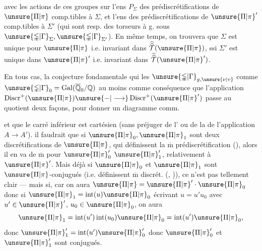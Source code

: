 avec les actions de ces groupes sur l'ens $P_{\Sigma}$ des prédiscrétifications de $\unsure{\Pi|\pi}$ comp.tibles à $\Sigma$, et l'ens  des prédiscrétifications de $\unsure{\Pi|\pi}'$ comp.tibles à $\Sigma'$ (qui sont resp. des torseurs à g. sous $\unsure{\mathbb{\Gamma}|\Gamma}_{\Sigma},\unsure{\mathbb{\Gamma}|\Gamma}_{\Sigma'}$). En même temps, on trouvera  que $\Sigma$ est unique pour $\unsure{\Pi|\pi}$ i.e. invariant dans $\widehat{\widehat{\mathcal T}}(\unsure{\Pi|\pi})$, ssi $\Sigma'$ est unique dans $\unsure{\Pi|\pi}'$ i.e. invariant dans $\widehat{\widehat{\mathcal T}}(\unsure{\Pi|\pi}')$.

En tous cas, la conjecture fondamentale qui  les $\unsure{\mathbb{\Gamma}|\Gamma}_{g,\unsure{\nu|v}}$ comme $\unsure{\mathbb{\Gamma}|\Gamma}_0=\operatorname{Gal}(\overline{\mathbb Q}_0/\mathbb Q)$  au moins comme conséquence que l'application $\operatorname{Discr}^{+}(\unsure{\Pi|\pi})\unsure{-|\longrightarrow}\operatorname{Discr}^{+}(\unsure{\Pi|\pi}')$ passe au quotient  deux façons, pour donner un diagramme comm.


et que le  carré inférieur est cartésien (sans préjuger de l' ou de la  de l'application $A\longrightarrow A'$).  il faudrait
que  si $\unsure{\Pi|\pi}_0,\unsure{\Pi|\pi}_1$ sont deux discrétifications  de $\unsure{\Pi|\pi}$, qui définissent la $\overline{\mathrm m}$ prédiscrétification (), alors il en va de $\overline{\mathrm m}$ pour  $\unsure{\Pi|\pi}'_0$  $\unsure{\Pi|\pi}'_1$, relativement à $\unsure{\Pi|\pi}'$. Mais déjà si $\unsure{\Pi|\pi}_0$ et $\unsure{\Pi|\pi}_1$ sont $\unsure{\Pi|\pi}$-conjugués (i.e. définissent $\overline{\mathrm m}$ discrét. (, \uline{})), ce n'est pas tellement clair ---  mais si, car on aura $\unsure{\Pi|\pi}=\unsure{\Pi|\pi}'\cdot\unsure{\Pi|\pi}_0$ donc si $\unsure{\Pi|\pi}_1=\operatorname{int}(u)\unsure{\Pi|\pi}_0$ écrivant $u=u'u_0$ avec $u'\in\unsure{\Pi|\pi}'$, $u_0\in\unsure{\Pi|\pi}_0$, on aura
\[
\unsure{\Pi|\pi}_1=\operatorname{int}(u')\operatorname{int}(u_0)\unsure{\Pi|\pi}_0=\operatorname{int}(u')\unsure{\Pi|\pi}_0,
\]
donc $\unsure{\Pi|\pi}'_1=\operatorname{int}(u')\unsure{\Pi|\pi}'_0$ donc $\unsure{\Pi|\pi}'_0$ et $\unsure{\Pi|\pi}'_1$ sont conjugués.

